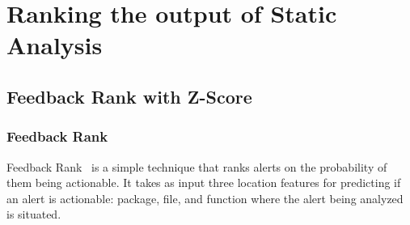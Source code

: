 
\section{Ranking the output of Static Analysis}\label{sec:ranking}



\subsection{Feedback Rank with Z-Score}


\subsubsection{Feedback Rank}

Feedback Rank~\cite{correlation_exploitation} is a simple technique that ranks alerts on the probability of them being actionable.
It takes as input three location features for predicting if an alert is actionable: package, file, and function where the alert being analyzed is situated. 


